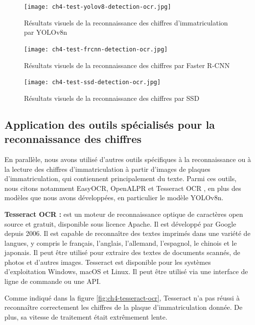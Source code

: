\begin{figure}[H]
	\centering
	\texttt{[image: ch4-test-yolov8-detection-ocr.jpg]}
	\caption{Résultats visuels de la reconnaissance des chiffres d'immatriculation par YOLOv8n}
\label{fig:ch4-test-yolov8-detection-ocr}
\end{figure}

\begin{figure}[H]
	\centering
	\texttt{[image: ch4-test-frcnn-detection-ocr.jpg]}
	\caption{ Résultats visuels de la reconnaissance des chiffres par Faster R-CNN}
\label{fig:ch4-test-frcnn-detection-ocr}
\end{figure}


\begin{figure}[H]
	\centering
	\texttt{[image: ch4-test-ssd-detection-ocr.jpg]}
	\caption{Résultats visuels de la reconnaissance des chiffres par SSD}
\label{fig:ch4-test-ssd-detection-ocr}
\end{figure}
\subsection{Application des outils spécialisés pour la reconnaissance des chiffres}

En parallèle, nous avons utilisé d'autres outils spécifiques à la reconnaissance ou à la lecture des chiffres d'immatriculation à partir d'images de plaques d'immatriculation, qui contiennent principalement du texte. Parmi ces outils, nous citons notamment EasyOCR\cite{ch4_EasyOCRsdsdsd}, OpenALPR\cite{openalpr-readme} et Tesseract OCR \cite{tesseract-ocr-guide}, en plus des modèles que nous avons développées, en particulier le modèle YOLOv8n.

\textbf{Tesseract OCR :} est un moteur de reconnaissance optique de caractères open source et gratuit, disponible sous licence Apache. Il est développé par Google depuis 2006\cite{ch4_ocr_Tesserac35}. Il est capable de reconnaître des textes imprimés dans une variété de langues, y compris le français, l'anglais, l'allemand, l'espagnol, le chinois et le japonais. Il peut être utilisé pour extraire des textes de documents scannés, de photos et d'autres images. Tesseract est disponible pour les systèmes d'exploitation Windows, macOS et Linux. Il peut être utilisé via une interface de ligne de commande ou une API.

Comme indiqué dans la figure \ref{fig:ch4-tesseract-ocr}, Tesseract n'a pas réussi à reconnaître correctement les chiffres de la plaque d'immatriculation donnée. De plus, sa vitesse de traitement était extrêmement lente.

